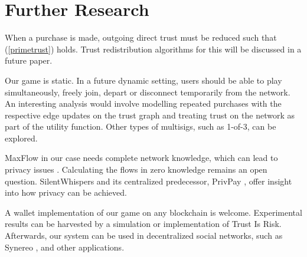 \section{Further Research}

    When a purchase is made, outgoing direct trust must be reduced such that (\ref{primetrust}) holds. Trust redistribution
    algorithms for this will be discussed in a future paper.
    
    Our game is static. In a future dynamic setting, users should be able to play simultaneously, freely join, depart or
    disconnect temporarily from the network. An interesting analysis would involve modelling repeated purchases with the
    respective edge updates on the trust graph and treating trust on the network as part of the utility function. Other types
    of multisigs, such as 1-of-3, can be explored.

    MaxFlow in our case needs complete network knowledge, which can lead to privacy issues \cite{deanonymisation}. Calculating
    the flows in zero knowledge remains an open question. SilentWhispers \cite{silentwhispers} and its centralized
    predecessor, PrivPay \cite{privpay}, offer insight into how privacy can be achieved.

    A wallet implementation of our game on any blockchain is welcome. Experimental results can be harvested by a simulation or
    implementation of Trust Is Risk. Afterwards, our system can be used in decentralized social networks, such as Synereo
    \cite{synereo}, and other applications.
